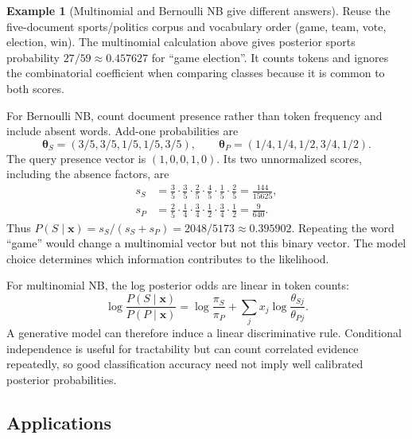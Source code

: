 \documentclass[11pt,twoside]{article}
\numberwithin{equation}{section}
\newcommand{\vect}[1]{\bm{#1}}
\theoremstyle{plain}
\theoremstyle{definition}
\newtheorem{example}[theorem]{Example}
\theoremstyle{remark}
\begin{document}
\begin{example}[Multinomial and Bernoulli NB give different answers]
Reuse the five-document sports/politics corpus and vocabulary order (game, team, vote, election, win). The multinomial calculation above gives posterior sports probability $27/59\approx0.457627$ for ``game election''. It counts tokens and ignores the combinatorial coefficient when comparing classes because it is common to both scores.

For Bernoulli NB, count document presence rather than token frequency and include absent words. Add-one probabilities are
\[
\vect\theta_S=(3/5,3/5,1/5,1/5,3/5),\qquad
\vect\theta_P=(1/4,1/4,1/2,3/4,1/2).
\]
The query presence vector is $(1,0,0,1,0)$. Its two unnormalized scores, including the absence factors, are
\begin{align*}
s_S&=\tfrac35\cdot\tfrac35\cdot\tfrac25\cdot\tfrac45\cdot\tfrac15\cdot\tfrac25
=\frac{144}{15625},\\
s_P&=\tfrac25\cdot\tfrac14\cdot\tfrac34\cdot\tfrac12\cdot\tfrac34\cdot\tfrac12
=\frac9{640}.
\end{align*}
Thus $P(S\mid\vect x)=s_S/(s_S+s_P)=2048/5173\approx0.395902$. Repeating the word ``game'' would change a multinomial vector but not this binary vector. The model choice determines which information contributes to the likelihood.
\end{example}

For multinomial NB, the log posterior odds are linear in token counts:
\[
\log\frac{P(S\mid\vect x)}{P(P\mid\vect x)}
=\log\frac{\pi_S}{\pi_P}+\sum_j x_j\log\frac{\theta_{Sj}}{\theta_{Pj}}.
\]
A generative model can therefore induce a linear discriminative rule. Conditional independence is useful for tractability but can count correlated evidence repeatedly, so good classification accuracy need not imply well calibrated posterior probabilities.

\subsection{Applications}
\end{document}
